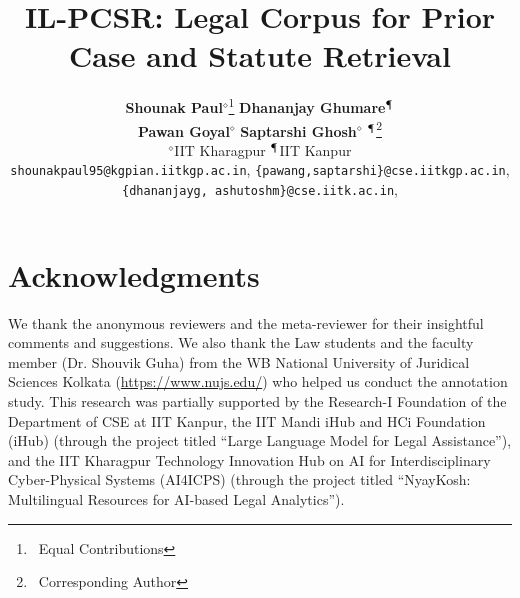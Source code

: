 \documentclass[11pt]{article}
\title{IL-PCSR: Legal Corpus for Prior Case and Statute Retrieval}
\author{ {\bf Shounak Paul}$^\diamond$\thanks{\ Equal Contributions} \qquad
{\bf Dhananjay Ghumare}$^\mathparagraph$\footnotemark[1] \qquad \\
\textbf{Pawan Goyal}$^\diamond$ \qquad \textbf{Saptarshi Ghosh}$^\diamond$ \qquad {\bf Ashutosh Modi}$^\mathparagraph$\thanks{\ Corresponding Author}  
 \\ 
        $^\diamond$IIT Kharagpur \qquad
        $^\mathparagraph$IIT Kanpur\\
  \texttt{shounakpaul95@kgpian.iitkgp.ac.in}, \texttt{\{pawang,saptarshi\}@cse.iitkgp.ac.in}, \\
  \texttt{\{dhananjayg, ashutoshm\}@cse.iitk.ac.in},  
}
\begin{document}
\maketitle

% 

% 
% 
% 
% 
% 














% 

%





\section*{Acknowledgments}

We thank the anonymous reviewers and the meta-reviewer for their insightful comments and suggestions.  We also thank the Law students and the faculty member (Dr. Shouvik Guha) from the WB National University of Juridical Sciences Kolkata (\url{https://www.nujs.edu/}) who helped us conduct the annotation study. This research was partially supported by the Research-I Foundation of the Department of CSE at IIT Kanpur, the IIT Mandi iHub and HCi Foundation (iHub) (through the project titled ``Large Language Model for Legal Assistance''), and the IIT Kharagpur Technology Innovation Hub on AI for Interdisciplinary Cyber-Physical Systems (AI4ICPS) (through the project titled ``NyayKosh: Multilingual Resources for AI-based Legal Analytics'').






\clearpage
\newpage


\end{document}
